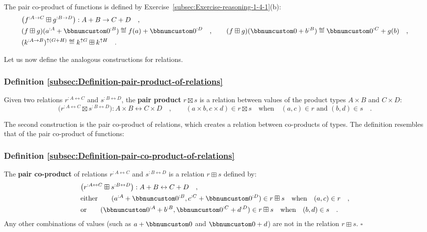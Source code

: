 The pair co-product of functions
is defined by Exercise~\ref{subsec:Exercise-reasoning-1-4-1}(b):
\begin{align*}
 & \big(f^{:A\rightarrow C}\boxplus g^{:B\rightarrow D}\big):A+B\rightarrow C+D\quad,\\
 & (f\boxplus g)(a^{:A}+\bbnum 0^{:B})\triangleq f(a)+\bbnum 0^{:D}\quad,\quad\quad(f\boxplus g)(\bbnum 0+b^{:B})\triangleq\bbnum 0^{:C}+g(b)\quad,\\
 & (k^{:A\rightarrow B})^{\uparrow(G+H)}\triangleq k^{\uparrow G}\boxplus k^{\uparrow H}\quad.
\end{align*}

Let us now define the analogous constructions for relations.

\subsubsection{Definition \label{subsec:Definition-pair-product-of-relations}\ref{subsec:Definition-pair-product-of-relations}}

Given two relations $r^{:A\leftrightarrow C}$ and $s^{:B\leftrightarrow D}$,
the \textbf{pair product}  $r\boxtimes s$
is a relation between values of the product types $A\times B$ and
$C\times D$:
\[
\big(r^{:A\leftrightarrow C}\boxtimes s^{:B\leftrightarrow D}\big):A\times B\leftrightarrow C\times D\quad,\quad\quad(a\times b,c\times d)\in r\boxtimes s\quad\text{when}\quad(a,c)\in r\text{ and }(b,d)\in s\quad.
\]

The second construction is the pair co-product of relations,
which creates a relation between co-products of types. The definition
resembles that of the pair co-product
of functions:

\subsubsection{Definition \label{subsec:Definition-pair-co-product-of-relations}\ref{subsec:Definition-pair-co-product-of-relations}}

The \textbf{pair co-product} of relations $r^{:A\leftrightarrow C}$
and $s^{:B\leftrightarrow D}$ is a relation $r\boxplus s$ defined
by:
\begin{align*}
 & \big(r^{:A\leftrightarrow C}\boxplus s^{:B\leftrightarrow D}\big):A+B\leftrightarrow C+D\quad,\\
 & \text{either}\quad\quad(a^{:A}+\bbnum 0^{:B},c^{:C}+\bbnum 0^{:D})\in r\boxplus s\quad\text{when}\quad(a,c)\in r\quad,\\
 & \text{or}\quad\quad(\bbnum 0^{:A}+b^{:B},\bbnum 0^{:C}+d^{:D})\in r\boxplus s\quad\text{when}\quad(b,d)\in s\quad.
\end{align*}
Any other combinations of values (such as $a+\bbnum 0$ and $\bbnum 0+d$)
are not in the relation $r\boxplus s$. $\square$

